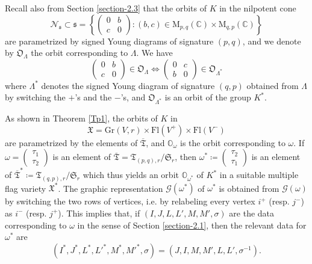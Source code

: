 \documentclass[11pt]{article}
\theoremstyle{definition}
\numberwithin{equation}{section}
\newcommand{\fs}{\mathfrak{s}}
\newcommand{\Mat}{\mathrm{M}}
\newcommand{\Xorbit}{\mathbb{O}}
\newcommand{\Nsorbit}{\mathfrak{O}}
\newcommand{\nilpotentsof}[1]{\mathcal{N}_{#1}}
\newcommand{\permutationsof}[1]{\mathfrak{S}_{#1}}
\newcommand{\ppermutationsof}{\mathfrak{T}}
\newcommand{\parameters}{\overline{\ppermutationsof}}
\newcommand{\Xfv}{\mathfrak{X}}
\newcommand{\Grass}{\mathrm{Gr}}
\newcommand{\Flags}{\mathrm{Fl}}
\newcommand{\mC}{\mathbb{C}}
\begin{document}
Recall also from Section \ref{section-2.3} that the orbits of $K$ in the nilpotent cone
\[
\nilpotentsof{\fs}\subset\fs=\left\{\begin{pmatrix} 0 & b\\ c & 0 \end{pmatrix}: (b,c)\in \Mat_{p,q}(\mC)\times\Mat_{q,p}(\mC)\right\}
\]
are parametrized by signed Young diagrams of signature $(p,q)$, and we denote by $\Nsorbit_\Lambda$ the orbit corresponding to $\Lambda$. We have
\begin{equation}
\label{4.6}
\begin{pmatrix} 0 & b\\ c & 0 \end{pmatrix}\in\Nsorbit_\Lambda\Longleftrightarrow \begin{pmatrix} 0 & c\\ b & 0 \end{pmatrix}\in\Nsorbit_{\Lambda^*}
\end{equation}
where $\Lambda^*$ denotes the signed Young diagram of signature $(q,p)$ obtained from $\Lambda$ by switching the $+$'s and the $-$'s, and $\Nsorbit_{\Lambda^*}$ is an orbit of the group $K^*$.

As shown in Theorem \ref{Tp1}, the orbits of $K$ in
\[
\Xfv=\Grass(V,r)\times\Flags(V^+)\times\Flags(V^-)
\]
are parametrized by the elements of $\parameters$, and
$\Xorbit_\omega$ is the orbit corresponding to $\omega$. If
$\omega=\begin{pmatrix} \tau_1\\ \tau_2 \end{pmatrix}$ is an
element of
$\parameters=\ppermutationsof_{(p,q),r}/\permutationsof{r}$, then
$\omega^*\coloneqq \begin{pmatrix} \tau_2\\ \tau_1 \end{pmatrix}$ is an
element of
$\parameters^*\coloneqq \ppermutationsof_{(q,p),r}/\permutationsof{r}$ which
thus yields an orbit $\Xorbit_{\omega^*}$ of $K^*$ in a suitable
multiple flag variety $\Xfv^*$. The graphic representation
$\mathcal{G}(\omega^*)$ of $\omega^*$ is obtained from
$\mathcal{G}(\omega)$ by switching the two rows of vertices, i.e.
by relabeling every vertex $i^+$ (resp. $j^-$) as $i^-$ (resp.
$j^+$). This implies that, if $(I,J,L,L',M,M',\sigma)$ are the data
corresponding to $\omega$ in the sense of Section \ref{section-2.1},
then the relevant data for $\omega^*$ are
\begin{equation}
\label{4.7}
(I^*,J^*,L^*,L'^*,M^*,M'^*,\sigma)=(J,I,M,M',L,L',\sigma^{-1}).
\end{equation}
\end{document}
